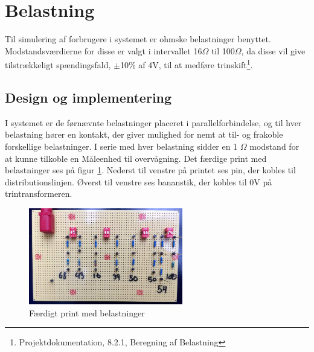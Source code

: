 
\section{Belastning}

Til simulering af forbrugere i systemet er ohmske belastninger benyttet. Modstandsværdierne for disse er valgt i intervallet 16$\Omega$ til 100$\Omega$, da disse vil give tilstrækkeligt spændingsfald, $\pm$10$\%$ af 4V, til at medføre trinskift\footnote{Projektdokumentation, 8.2.1, Beregning af Belastning}. 

\subsection{Design og implementering}

I systemet er de førnævnte belastninger placeret i parallelforbindelse, og til hver belastning hører en kontakt, der giver mulighed for nemt at til- og frakoble forskellige belastninger. I serie med hver belastning sidder en 1 $\Omega$ modstand for at kunne tilkoble en Måleenhed til overvågning. Det færdige print med belastninger ses på figur \ref{fig:Belastning}. Nederst til venstre på printet ses pin, der kobles til distributionslinjen. Øverst til venstre ses bananstik, der kobles til 0V på trintransformeren. 

\begin{figure}[H]
	\centering
	\includegraphics[width=0.6\textwidth]{figure/Belastningskreds}
	\caption{Færdigt print med belastninger}
	\label{fig:Belastning}
\end{figure}